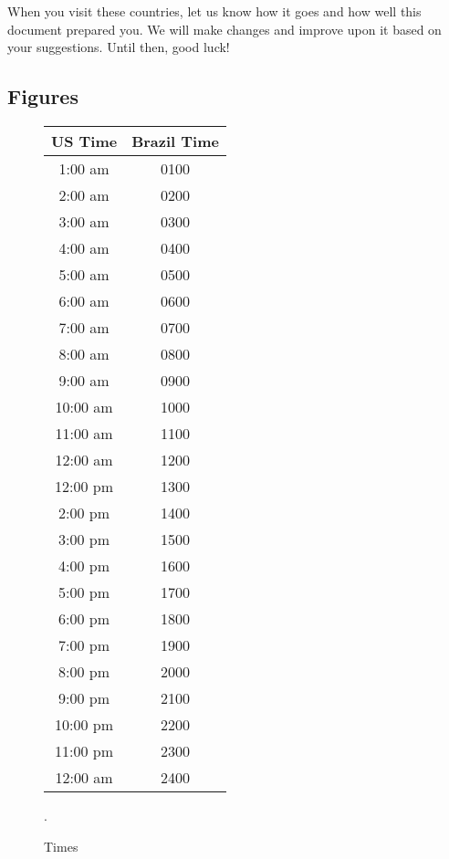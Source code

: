 \documentclass[11pt,a4paper,twoside]{report}
\begin{document}
When you visit these countries, let us know how it goes and how well
this document prepared you. We will make changes and improve upon it based
on your suggestions. Until then, good luck!

\nocite{*}

\appendix

\begin{appendices}

    \printbibliography[
        title={Brazil Bibliography},
        keyword=brazil,
        heading=bibnumbered
    ]

    \printbibliography[
        title={Russia Bibliography},
        keyword=russia,
        heading=bibnumbered
    ]

    \printbibliography[
        title={South Africa Bibliography},
        keyword=southAfrica,
        heading=bibnumbered
    ]

    \chapter{Figures}
    \begin{figure}[h]
        \centering
        \begin{tabular}{ c || c }
            US Time & Brazil Time \\
            \hline
            1:00 am & 0100 \\
            2:00 am & 0200 \\
            3:00 am & 0300 \\
            4:00 am & 0400 \\
            5:00 am & 0500 \\
            6:00 am & 0600 \\
            7:00 am & 0700 \\
            8:00 am & 0800 \\
            9:00 am & 0900 \\
            10:00 am & 1000 \\
            11:00 am & 1100 \\
            12:00 am & 1200 \\
            12:00 pm & 1300 \\
            2:00 pm & 1400 \\
            3:00 pm & 1500 \\
            4:00 pm & 1600 \\
            5:00 pm & 1700 \\
            6:00 pm & 1800 \\
            7:00 pm & 1900 \\
            8:00 pm & 2000 \\
            9:00 pm & 2100 \\
            10:00 pm & 2200 \\
            11:00 pm & 2300 \\
            12:00 am & 2400 \\
            \hline
        \end{tabular}
        \caption{Times}.
        \label{fig:Times}
    \end{figure}
\end{appendices}
\end{document}
